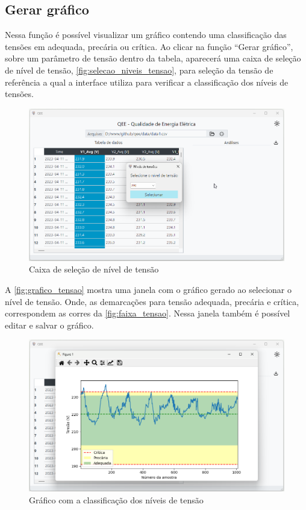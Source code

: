 \subsection{Gerar gráfico}

Nessa função é possível visualizar um gráfico contendo uma classificação das tensões em adequada, precária ou crítica. Ao clicar na função “Gerar gráfico”, sobre um parâmetro de tensão dentro da tabela, aparecerá uma caixa de seleção de nível de tensão, \autoref{fig:selecao_niveis_tensao}, para seleção da tensão de referência a qual a interface utiliza para verificar a classificação dos níveis de tensões.

\begin{figure}[H]
  \centering
  \caption{Caixa de seleção de nível de tensão}
  \label{fig:selecao_niveis_tensao}
  \includegraphics[width=15cm]{illustrations/figures/selecao_niveis_tensao.png}
\end{figure}

A \autoref{fig:grafico_tensao} mostra uma janela com o gráfico gerado ao selecionar o nível de tensão. Onde, as demarcações para tensão adequada, precária e crítica, correspondem as corres da \autoref{fig:faixa_tensao}. Nessa janela também é possível editar e salvar o gráfico.

\begin{figure}[H]
  \centering
  \caption{Gráfico com a classificação dos níveis de tensão}
  \label{fig:grafico_tensao}
  \includegraphics[width=15cm]{illustrations/figures/grafico_tensao.png}
\end{figure}

